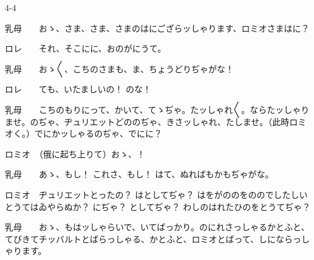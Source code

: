 \documentclass[tate,paper=b6j,jafontsize=9pt]{jlreq}
\begin{document}
\begin{azconvIndented}{4\zw}{-4\zw}

乳母　　おゝ、さま、さま、さまのはにござらッしゃります、ロミオさまはに？

ロレ　　それ、そこにに、おのがにうて。

乳母　　おゝ{〳〵}、こちのさまも、ま、ちょうどりぢゃがな！

ロレ　　ても、いたましいの！ のな！

乳母　　こちのもりにって、かいて、てゝぢゃ。たッしゃれ{〳〵}。ならたッしゃりませ。のぢゃ、ヂュリエットどののぢゃ、きさッしゃれ、たしませ。（此時ロミオく。）でにかッしゃるのぢゃ、でにに？

ロミオ　（俄に起ち上りて）おゝ、！

乳母　　あゝ、もし！ これさ、もし！ はて、ぬればもかもぢゃがな。

ロミオ　ヂュリエットとったの？ はとしてぢゃ？ はをがののをののでしたしいとうてはゐやらぬか？ にぢゃ？ としてぢゃ？ わしのはれたひのをとうてぢゃ？

乳母　　おゝ、もはッしゃらいで、いてばっかり。のにれさっしゃるかとふと、てびきてチッバルトとばらっしゃる、かとふと、ロミオとばって、しにならっしゃります。


\end{azconvIndented}
\end{document}
